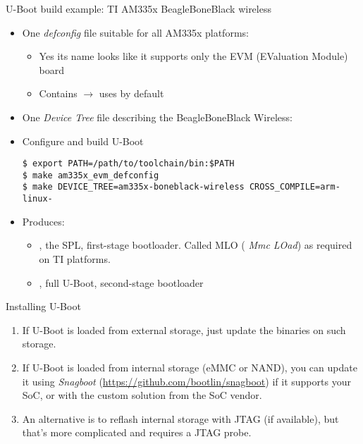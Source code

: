 \begin{frame}[fragile]{U-Boot build example: TI AM335x BeagleBoneBlack wireless}
  \begin{itemize}
  \item One {\em defconfig} file suitable for all AM335x platforms:
    \begin{itemize}
    \item Yes its name looks like it supports only the EVM (EValuation
      Module) board
    \item Contains 
      $\rightarrow$ uses
       by default
    \end{itemize}
  \item One {\em Device Tree} file describing the BeagleBoneBlack
    Wireless:
  \item Configure and build U-Boot
\begin{Verbatim}[breaklines=true,breakanywhere=true]
$ export PATH=/path/to/toolchain/bin:$PATH
$ make am335x_evm_defconfig
$ make DEVICE_TREE=am335x-boneblack-wireless CROSS_COMPILE=arm-linux-
\end{Verbatim}
  \item Produces:
    \begin{itemize}
    \item {}, the SPL, first-stage bootloader. Called MLO ({\em
    Mmc LOad}) as required on TI platforms.
    \item {}, full U-Boot, second-stage bootloader
    \end{itemize}
  \end{itemize}
\end{frame}

\begin{frame}{Installing U-Boot}
  \begin{enumerate}
  \item If U-Boot is loaded from external storage, just update
        the binaries on such storage.
  \item If U-Boot is loaded from internal storage (eMMC or NAND),
        you can update it using {\em Snagboot}
        (\url{https://github.com/bootlin/snagboot}) if it supports
        your SoC, or with the custom solution from the SoC vendor.
  \item An alternative is to reflash internal storage with JTAG
        (if available), but that's more complicated and requires
        a JTAG probe.
  \end{enumerate}
\end{frame}

